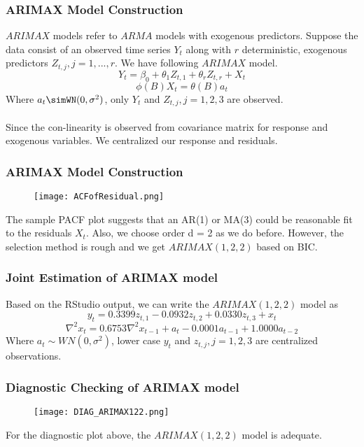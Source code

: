 \documentclass{beamer}
\begin{document}
\begin{frame}
\frametitle{ARIMAX Model Construction}
\begin{item}
\item $ARIMAX$ models refer to $ARMA$ models with exogenous predictors. Suppose the data consist of an observed time series $Y_{t}$ along with $r$ deterministic, exogenous predictors $Z_{t,j},j=1,...,r$. We have following $ARIMAX$ model.
\[Y_{t} =\beta_{0}+\theta_{1}Z_{t,1}+\theta_{r}Z_{t,r}+X_{t}\]
\[\phi(B)X_{t}=\theta(B)a_{t}\]
Where $a_{t}\simWN(0,\sigma^2)$, only $Y_{t}$ and $Z_{t,j},j=1,2,3$ are observed. \\

\\Since the con-linearity is observed from covariance matrix for response and exogenous variables. We centralized our response and residuals.

\end{item}
\end{frame}

\begin{frame}
\frametitle{ARIMAX Model Construction}
\begin{figure}
    \centering
    \texttt{[image: ACFofResidual.png]}
    \label{fig:my_label}
\end{figure}
The sample PACF plot suggests that an AR(1) or MA(3) could be reasonable fit to the residuals $X_{t}$. Also, we choose order d = 2 as we do before. However, the selection method is rough and we get $ARIMAX(1,2,2)$ based on BIC.
\end{frame}

\begin{frame}
\frametitle{Joint Estimation of ARIMAX model}

Based on the RStudio output, we can write the $ARIMAX(1,2,2)$ model as
\[y_{t} =0.3399z_{t,1}-0.0932z_{t,2}+0.0330z_{t,3}+x_{t}\]
\[\nabla^2x_{t}=0.6753\nabla^2x_{t-1}+a_{t}-0.0001a_{t-1}+1.0000a_{t-2}\]
Where $a_{t}\sim WN(0,\sigma^2)$, lower case $y_{t}$ and $z_{t,j},j=1,2,3$ are centralized observations. \\
\end{frame}

\begin{frame}
\frametitle{Diagnostic Checking of ARIMAX model}
\begin{figure}
    \centering
    \texttt{[image: DIAG\_ARIMAX122.png]}
    \label{fig:my_label}
\end{figure}
For the diagnostic plot above, the $ARIMAX(1,2,2 )$ model is adequate.
\end{frame}
\end{document}
